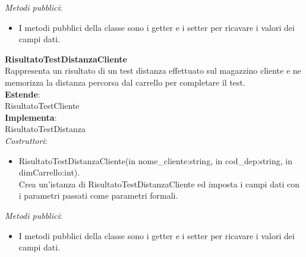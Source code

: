 \textit{Metodi pubblici}:\\
\begin{itemize}
    \item I metodi pubblici della classe sono i getter e i setter per ricavare i valori dei campi dati.\\
\end{itemize} 
\textbf{RisultatoTestDistanzaCliente}\\
Rappresenta un risultato di un test distanza effettuato sul magazzino cliente e ne memorizza la distanza percorsa dal carrello per completare il test.\\
\textbf{Estende}:\\
RisultatoTestCliente\\
\textbf{Implementa}:\\
RisultatoTestDistanza\\
\textit{Costruttori}:\\
\begin{itemize}
    \item RisultatoTestDistanzaCliente(in nome\_cliente:string, in cod\_dep:string, in dimCarrello:int).\\
    Crea un'istanza di RisultatoTestDistanzaCliente ed imposta i campi dati con i parametri passati come parametri formali.\\
\end{itemize}
\textit{Metodi pubblici}:\\
\begin{itemize}
    \item I metodi pubblici della classe sono i getter e i setter per ricavare i valori dei campi dati.\\
\end{itemize} 

